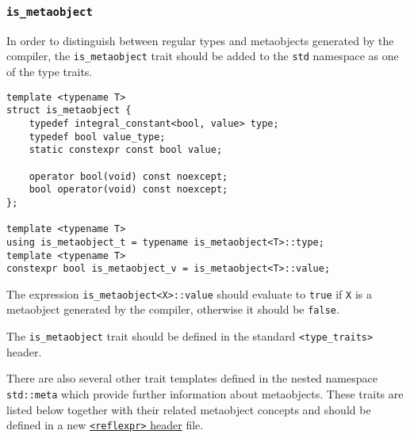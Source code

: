 \subsubsection{\texttt{is\_metaobject}}

In order to distinguish between regular types and metaobjects generated
by the compiler, the \texttt{is\_metaobject} trait should be added
to the \texttt{std} namespace as one of the type traits. 

\begin{verbatim}
template <typename T>
struct is_metaobject {
	typedef integral_constant<bool, value> type;
	typedef bool value_type;
	static constexpr const bool value;

	operator bool(void) const noexcept;
	bool operator(void) const noexcept;
};

template <typename T>
using is_metaobject_t = typename is_metaobject<T>::type;
template <typename T>
constexpr bool is_metaobject_v = is_metaobject<T>::value;
\end{verbatim}

The expression \texttt{is\_metaobject<X>::value} should evaluate to \texttt{true}
if \texttt{X} is a metaobject generated by the compiler, otherwise it should
be \texttt{false}.

The \texttt{is\_metaobject} trait should be defined in the standard
\texttt{<type\_traits>} header.

There are also several other trait templates defined in the nested namespace
\texttt{std::meta} which provide further information about metaobjects.
These traits are listed below together with their related metaobject concepts
and should be defined in a new
\hyperref[section-reflexpr-header]{\texttt{<reflexpr>} header} file.
